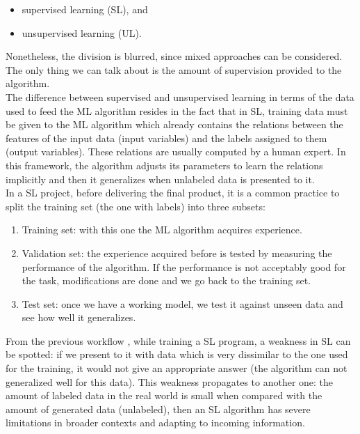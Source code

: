 \begin{itemize}
    \item supervised learning (SL), and 
    \item unsupervised learning (UL).
\end{itemize}

Nonetheless, the division is blurred, since mixed approaches can be considered. The only thing we can talk about is the amount of supervision provided to the algorithm.\\

The difference between supervised and unsupervised learning in terms of the data used to feed the ML algorithm resides in the fact that in SL, training data must be given to the ML algorithm which already contains the relations between the features of the input data (input variables) and the labels assigned to them (output variables). These relations are usually computed by a human expert. In this framework, the algorithm adjusts its parameters to learn the relations implicitly and then it generalizes when unlabeled data is presented to it.\\

In a SL project, before delivering the final product, it is a common practice to split the training set (the one with labels) into three subsets:

\begin{enumerate}
    \item Training set: with this one the ML algorithm acquires experience.
    \item Validation set: the experience acquired before is tested by measuring the performance of the algorithm. If the performance is not acceptably       good for the task, modifications are done and we go back to the training set.
    \item Test set: once we have a working model, we test it against unseen data and see how well it generalizes.\\
\end{enumerate}

From the previous workflow \cite{Geron2017}, while training a SL program, a weakness in SL can be spotted: if we present to it with data which is very dissimilar to the one used for the training, it would not give an appropriate answer (the algorithm can not generalized well for this data). This weakness propagates to another one: the amount of labeled data in the real world is small when compared with the amount of generated data (unlabeled), then an SL algorithm has severe limitations in broader contexts and adapting to incoming information\cite{Patel2019}.\\

